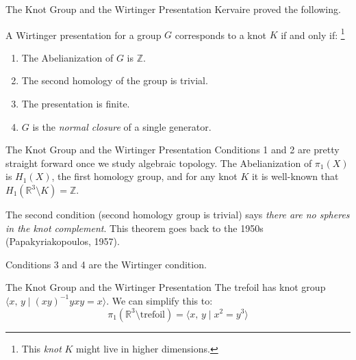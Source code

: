 \documentclass{beamer}
\begin{document}
    \begin{frame}{The Knot Group and the Wirtinger Presentation}
        Kervaire proved the following.
        \begin{theorem}
            A Wirtinger presentation for a group $G$
            corresponds to a knot $K$ if and only if:%
            \footnote{%
                This \textit{knot} $K$ might live in higher dimensions.
            }
            \begin{enumerate}
                \item
                    The Abelianization of $G$ is $\mathbb{Z}$.
                \item
                    The second homology of the group is trivial.
                \item
                    The presentation is finite.
                \item
                    $G$ is the \textit{normal closure} of a single generator.
            \end{enumerate}
        \end{theorem}
    \end{frame}
    \begin{frame}{The Knot Group and the Wirtinger Presentation}
        Conditions 1 and 2 are pretty straight forward once we study algebraic
        topology. The Abelianization of $\pi_{1}(X)$ is $H_{1}(X)$, the
        first homology group, and for any knot $K$ it is well-known that
        $H_{1}(\mathbb{R}^{3}\setminus{K})=\mathbb{Z}$.
        \par\hfill\par
        The second condition (second homology group is trivial)
        says \textit{there are no spheres in the knot complement}.
        This theorem goes back to the 1950s
        (Papakyriakopoulos, 1957).
        \par\hfill\par
        Conditions 3 and 4 are the Wirtinger condition.
    \end{frame}
    \begin{frame}{The Knot Group and the Wirtinger Presentation}
        The trefoil has knot group
        $\langle{x,\,y\;|\;(xy)^{-1}yxy=x}\rangle$.
        We can simplify this to:
        \begin{equation}
            \pi_{1}(\mathbb{R}^{3}\setminus\textrm{trefoil})
            =\langle{x,\,y\;|\;x^{2}=y^{3}}\rangle
        \end{equation}
    \end{frame}
\end{document}
